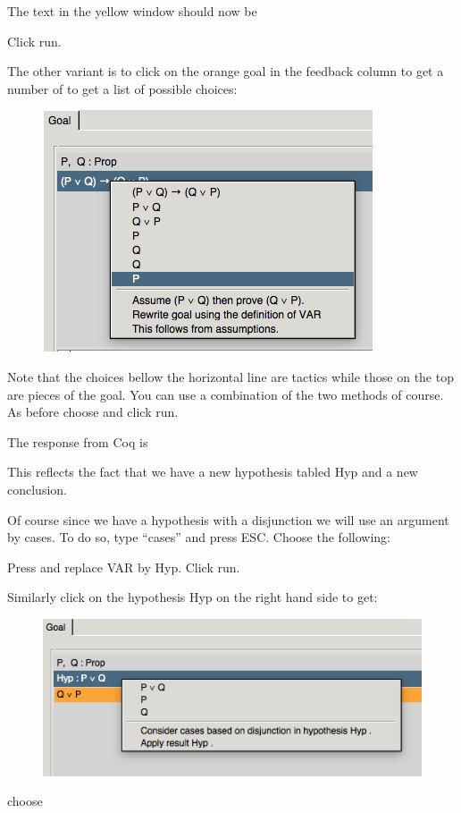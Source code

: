 The text in the yellow window should now be 

\noindent
{}

Click run.


The other variant is to click on the orange goal in the feedback column to get a number of  to get a list of possible choices:
\begin{figure}[h!]
\includegraphics[scale=0.5]{Installation/clickgoal.png}
\label{tactics}
\end{figure}
Note that the choices bellow the horizontal line are tactics while those on the top are pieces of the goal. You can use a combination of the two methods of course. As before choose 
 and click run.


The response from Coq is


This reflects the fact that we have a new hypothesis tabled Hyp  and a new conclusion.

Of course since we have a hypothesis with a disjunction we will use an argument by cases. To do so, type ``cases'' and press ESC. Choose the following:

Press \VAR and replace VAR by Hyp. Click run.

Similarly click on the hypothesis Hyp on the right hand side to get:

\begin{figure}[h!]
\includegraphics[scale=0.5]{Installation/clickgoal1.png}
\label{tactics}
\end{figure}
 choose 

